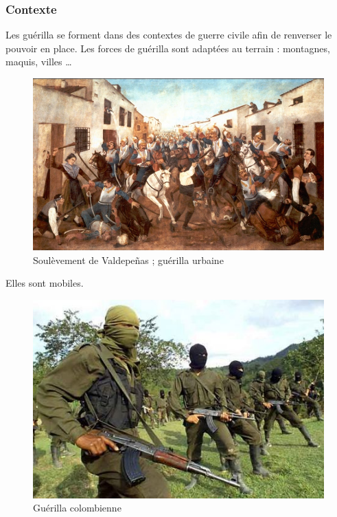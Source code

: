 \documentclass{article}
\begin{document}
\subsubsection{Contexte}
Les guérilla se forment dans des contextes de guerre civile afin de renverser le pouvoir en place. Les forces de guérilla sont adaptées au terrain : montagnes, maquis, villes \ldots
\begin{figure}[H]
	\begin{centering}
	\includegraphics[width=\linewidth]{../ressources/valdepenas}
	\caption{Soulèvement de Valdepeñas ; guérilla urbaine \cite{valdepenas}}
	\end{centering}
\end{figure}
Elles sont mobiles.
\begin{figure}[H]
	\begin{centering}
	\includegraphics[]{../ressources/guerrilla_colombia}
	\caption{Guérilla colombienne \cite{guerrilla_colombia}}
	\end{centering}
\end{figure}
\end{document}
